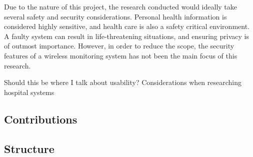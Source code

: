 Due to the nature of this project, the research conducted would ideally take several safety and security considerations. Personal health information is considered highly sensitive, and health care is also a safety critical environment. A faulty system can result in life-threatening situations, and ensuring privacy is of outmost importance. However, in order to reduce the scope, the security features of a wireless monitoring system has not been the main focus of this research.

Should this be where I talk about usability? Considerations when researching hospital systems 


\subsection{Contributions} %
\label{sub:contributions}


\subsection{Structure} %
\label{sub:structure}


